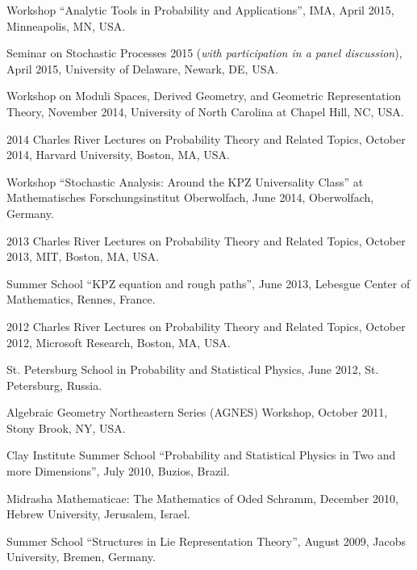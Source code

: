 \documentclass[letterpaper,11pt]{article}
\begin{document}
\begin{etaremune}
\item Workshop ``Analytic Tools in Probability and Applications'', IMA, April 2015, Minneapolis, MN, USA.

\item Seminar on Stochastic Processes 2015 (\emph{with participation in a panel discussion}), 
April 2015, University of Delaware, 
Newark, DE, USA.

\item Workshop on Moduli Spaces, Derived Geometry, and Geometric Representation Theory, November 2014, University of North Carolina at Chapel Hill, NC, USA.

\item 2014 Charles River Lectures on Probability Theory and Related Topics, 
October 2014, Harvard University, Boston, MA, USA.

\item Workshop ``Stochastic Analysis: Around the KPZ Universality Class'' at Mathematisches Forschungsinstitut Oberwolfach,
June 2014, Oberwolfach, Germany.

\item 2013 Charles River Lectures on Probability Theory and Related Topics, 
October 2013, MIT, Boston, MA, USA.

\item Summer School ``KPZ equation and rough paths'', 
June 2013, 
Lebesgue Center of Mathematics, Rennes, France.

\item 2012 Charles River Lectures on Probability Theory and Related Topics, 
October 2012, Microsoft Research, Boston, MA, USA.

\item St. Petersburg School in Probability and Statistical Physics, June 2012, St. Petersburg, Russia.

\item Algebraic Geometry Northeastern Series (AGNES) Workshop, 
October 2011,
Stony Brook, NY, USA.

\item Clay Institute Summer School ``Probability and Statistical Physics in Two and more Dimensions'', July 2010, Buzios, Brazil. 

\item Midrasha Mathematicae: The Mathematics of Oded Schramm, December 2010, Hebrew University, Jerusalem, Israel. 

\item Summer School ``Structures in Lie Representation Theory'', August 2009, Jacobs University, Bremen, Germany. 
\end{etaremune}
\end{document}
